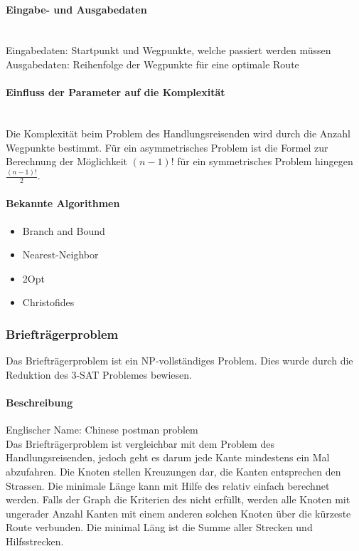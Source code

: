 	\paragraph{Eingabe- und Ausgabedaten}\mbox{}\\
	Eingabedaten: Startpunkt und Wegpunkte, welche passiert werden müssen\\
	Ausgabedaten: Reihenfolge der Wegpunkte für eine optimale Route

	\paragraph{Einfluss der Parameter auf die Komplexität}\mbox{}\\
	Die Komplexität beim Problem des Handlungsreisenden wird durch die Anzahl Wegpunkte bestimmt. Für ein asymmetrisches Problem ist die Formel zur Berechnung der Möglichkeit $(n-1)!$ 
	für ein symmetrisches Problem hingegen $\frac{(n-1)!}{2}$.
	
	 \newpage
	\paragraph{Bekannte Algorithmen}\cite{tsp_algorithmen} \cite{tsp_semesterarbeit} \cite{pomberger2008algorithmen}
	\begin{itemize}
		\item Branch and Bound
		\item Nearest-Neighbor
		\item 2Opt
		\item Christofides
	\end{itemize}

	\subsubsection{Briefträgerproblem}\label{chinese_postman}
	Das Briefträgerproblem ist ein NP-vollständiges Problem. Dies wurde durch die Reduktion des 3-SAT Problemes bewiesen.

	\paragraph{Beschreibung}
	Englischer Name: Chinese postman problem\\
	Das Briefträgerproblem ist vergleichbar mit dem Problem des Handlungsreisenden, jedoch geht es darum jede Kante mindestens ein Mal abzufahren. Die Knoten stellen Kreuzungen dar, die 
	Kanten entsprechen den Strassen. Die minimale Länge kann mit Hilfe des  relativ einfach berechnet werden. Falls der Graph die Kriterien des 
	 nicht erfüllt, werden alle Knoten mit ungerader Anzahl Kanten mit einem anderen solchen Knoten über die kürzeste Route verbunden. 
	Die minimal Läng ist die Summe aller Strecken und Hilfsstrecken.
	\cite{pearson2004decision}

